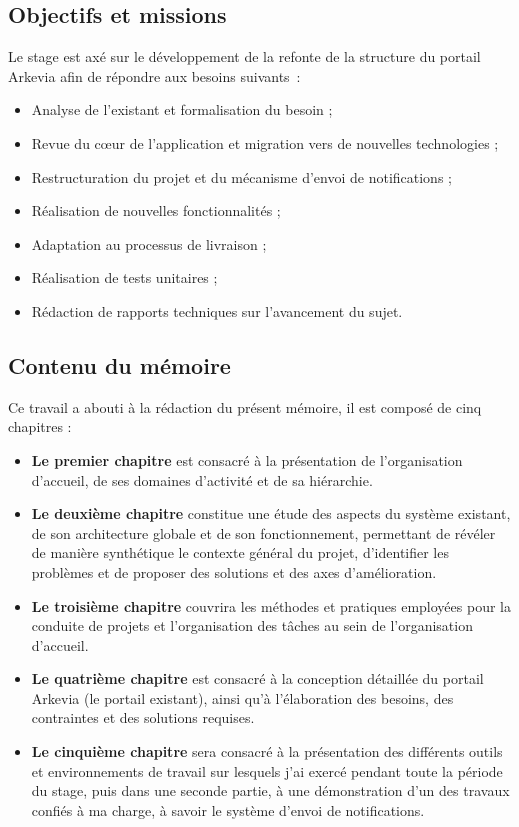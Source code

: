 \subsection*{Objectifs et missions}
Le stage est axé sur le développement de la refonte de la structure du portail Arkevia afin de répondre aux besoins suivants :
\begin{itemize}
    \item Analyse de l’existant et formalisation du besoin ;
    \item Revue du cœur de l’application et migration vers de nouvelles technologies ;
    \item Restructuration du projet et du mécanisme d'envoi de notifications ;
    \item Réalisation de nouvelles fonctionnalités ;
    \item Adaptation au processus de livraison ;
    \item Réalisation de tests unitaires ;
    \item Rédaction de rapports techniques sur l’avancement du sujet.
\end{itemize}

\subsection*{Contenu du mémoire}
Ce travail a abouti à la rédaction du présent mémoire, il est composé de cinq chapitres : 
\begin{itemize}
    \item \textbf{Le premier chapitre} est consacré à la présentation de l'organisation d'accueil, de ses domaines d'activité et de sa hiérarchie.
    \item \textbf{Le deuxième chapitre} constitue une étude des aspects du système existant, de son architecture globale et de son fonctionnement, permettant de révéler de manière synthétique le contexte général du projet, d'identifier les problèmes et de proposer des solutions et des axes d'amélioration.
    \item \textbf{Le troisième chapitre} couvrira les méthodes et pratiques employées pour la conduite de projets et l'organisation des tâches au sein de l'organisation d'accueil.
    \item \textbf{Le quatrième chapitre} est consacré à la conception détaillée du portail Arkevia (le portail existant), ainsi qu'à l'élaboration des besoins, des contraintes et des solutions requises.
    \item \textbf{Le cinquième chapitre} sera consacré à la présentation des différents outils et environnements de travail sur lesquels j'ai exercé pendant toute la période du stage, puis dans une seconde partie, à une démonstration d'un des travaux confiés à ma charge, à savoir le système d'envoi de notifications.
\end{itemize}